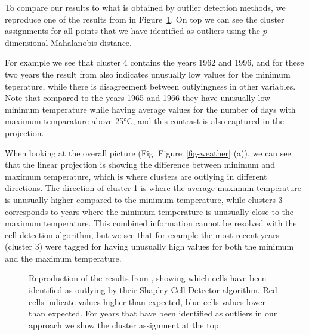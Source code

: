 \documentclass[
  12pt]{article}
\begin{document}
To compare our results to what is obtained by outlier detection methods,
we reproduce one of the results from \citet{filzmoser2018} in
Figure~\ref{fig-shapley}. On top we can see the cluster assignments for
all points that we have identified as outliers using the
\(p\)-dimensional Mahalanobis distance.

For example we see that cluster 4 contains the years 1962 and 1996, and
for these two years the result from \citet{filzmoser2018} also indicates
unusually low values for the minimum teperature, while there is
disagreement between outlyingness in other variables. Note that compared
to the years 1965 and 1966 they have unusually low minimum temperature
while having average values for the number of days with maximum
temparature above 25°C, and this contrast is also captured in the
projection.

When looking at the overall picture (Fig. Figure~\ref{fig-weather} (a)),
we can see that the linear projection is showing the difference between
minimum and maximum temperature, which is where clusters are outlying in
different directions. The direction of cluster 1 is where the average
maximum temperature is unusually higher compared to the minimum
temperature, while clusters 3 corresponds to years where the minimum
temperature is unusually close to the maximum temperature. This combined
information cannot be resolved with the cell detection algorithm, but we
see that for example the most recent years (cluster 3) were tagged for
having unusually high values for both the minimum and the maximum
temperature.

\begin{figure}


\caption{\label{fig-shapley}Reproduction of the results from
\citet{filzmoser2018}, showing which cells have been identified as
outlying by their Shapley Cell Detector algorithm. Red cells indicate
values higher than expected, blue cells values lower than expected. For
years that have been identified as outliers in our approach we show the
cluster assignment at the top.}

\end{figure}%
\end{document}
